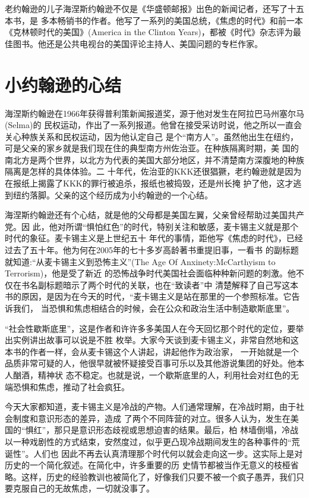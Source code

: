 \documentclass[10pt]{article}
\begin{document}
{老约翰逊的儿子海涅斯\textperiodcentered 约翰逊不仅是《华盛顿邮报》出色的新闻记者，还写了十五本书，是
多本畅销书的作者。他写了一系列的美国总统，《焦虑的时代》和前一本《克林顿时代的美国》(America in the
Clinton Years)，都被《时代》杂志评为最佳图书。他还是公共电视台的美国评论主持人、美国问题的专栏作家。

\pagebreak
\section{小约翰逊的心结}

海涅斯\textperiodcentered 约翰逊在1966年获得普利策新闻报道奖，源于他对发生在阿拉巴马州塞尔马(Selma)的
民权运动，作出了一系列报道。他曾在接受采访时说，他之所以一直会关心种族关系和民权运动，因为他认定自己
是个``南方人''。虽然他出生在纽约，可是父亲的家乡就是我们现在住的典型南方州佐治亚。在种族隔离时期，美
国的南北方是两个世界，以北方为代表的美国大部分地区，并不清楚南方深腹地的种族隔离是怎样的具体体验。二
十年代，佐治亚的KKK还很猖獗，老约翰逊就是因为在报纸上揭露了KKK的罪行被追杀，报纸也被捣毁，还是州长掩
护了他，这才逃到纽约落脚。父亲的这个经历成为小约翰逊的一个心结。

海涅斯\textperiodcentered 约翰逊还有个心结，就是他的父母都是美国左翼，父亲曾经帮助过美国共产党。因
此，他对所谓``惧怕红色''的时代，特别关注和敏感，麦卡锡主义就是那个时代的象征。麦卡锡主义是上世纪五十
年代的事情，距他写《焦虑的时代》，已经过去了五十年。他为何在2005年的七十多岁高龄著书重提旧事，一看书
的副标题就知道:``从麦卡锡主义到恐怖主义''(The Age Of Anxinety:McCarthyism to Terrorism)，他是受了新近
的恐怖战争时代美国社会面临种种新问题的刺激。他不仅在书名副标题暗示了两个时代的关联，也在``致读者''中
清楚解释了自己写这本书的原因，是因为在今天的时代，``麦卡锡主义是站在那里的一个参照标准。它告诉我们，
当恐惧和焦虑相结合的时候，会在公众和政治生活中制造歇斯底里''。

``社会性歇斯底里''，这是作者和许许多多美国人在今天回忆那个时代的定位，要举出实例讲出故事可以说是不胜
枚举。大家今天谈到麦卡锡主义，非常自然地和这本书的作者一样，会从麦卡锡这个人讲起，讲起他作为政治家，
一开始就是一个品质非常可疑的人，他很早就被怀疑接受百事可乐以及其他游说集团的好处。他本人酗酒，精神状
态不稳定。也就是说，一个歇斯底里的人，利用社会对红色的无端恐惧和焦虑，推动了社会疯狂。

今天大家都知道，麦卡锡主义是冷战的产物。人们通常理解，在冷战时期，由于社会制度和意识形态的差异，造成
了两个不同阵营的对立。很多人认为，发生在美国的``惧红''，那只是意识形态歧视或思想迫害的结果。最后，柏
林墙倒塌，冷战以一种戏剧性的方式结束，安然度过，似乎更凸现冷战期间发生的各种事件的``荒诞性''。人们也
因此不再去认真清理那个时代何以就会走向这一步。这实际上是对历史的一个简化叙述。在简化中，许多重要的历
史情节都被当作无意义的枝桠省略。这样，历史的经验教训也被简化了，好像我们只要不被一个疯子愚弄，我们只
要克服自己的无故焦虑，一切就没事了。

}
\end{document}

